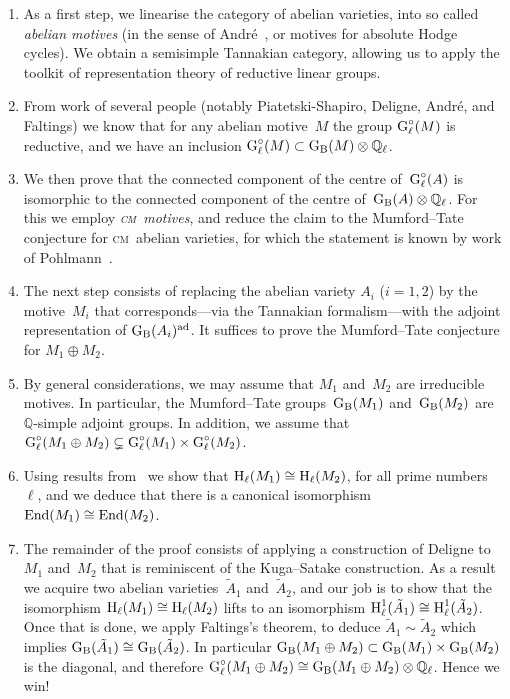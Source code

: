 \documentclass[10pt,twoside,leqno]{article}
\numberwithin{equation}{subsection}
\newcommand{\End}{\textnormal{End}}
\newcommand{\QQ}{\mathbb{Q}}
\newcommand{\QQl}{\QQ_{\ell}}
\newcommand{\ad}{\textnormal{ad}}
\newcommand{\HH}{\textnormal{H}}
\newcommand{\Hl}{\HH_{\ell}}
\newcommand{\GG}{\textnormal{G}}
\newcommand{\GB}{\GG_{\textnormal{B}}}
\newcommand{\Gl}{\GG_{\ell}}
\newcommand{\Glc}{\Gl^{\circ}}
\newcommand{\cm}{\textsc{cm}}
\begin{document}
\begin{enumerate}
 \item As a first step, we linearise the category of abelian varieties,
  into so called \emph{abelian motives} (in the sense of Andr\'e~\cite{An95},
  or motives for absolute Hodge cycles).
  We obtain a semisimple Tannakian category,
  allowing us to apply the toolkit
  of representation theory of reductive linear groups.
 \item From work of several people (notably Piatetski-Shapiro,
  Deligne, Andr\'e, and Faltings) we know that for any abelian motive~$M$
  the group $\Glc(M)$ is reductive,
  and we have an inclusion $\Glc(M) \subset \GB(M) \otimes \QQl$.
 \item We then prove that the connected component of the centre of~$\Glc(A)$ is
  isomorphic to the connected component of the centre of~$\GB(A) \otimes \QQl$.
  For this we employ \emph{\cm~motives},
  and reduce the claim to the Mumford--Tate conjecture for \cm~abelian varieties,
  for which the statement is known by work of Pohlmann~\cite{Pohl68}.
 \item The next step consists of replacing the abelian variety $A_i$ ($i = 1,2$)
  by the motive~$M_i$ that corresponds---via the Tannakian formalism---with
  the adjoint representation of $\GB(A_i)^\ad$.
  It suffices to prove the Mumford--Tate conjecture for $M_1 \oplus M_2$.
 \item By general considerations,
  we may assume that $M_1$ and~$M_2$ are irreducible motives.
  In particular, the Mumford--Tate groups~$\GB(M_1)$ and~$\GB(M_2)$
  are $\QQ$-simple adjoint groups.
  In addition, we assume that
  $\Glc(M_1 \oplus M_2) \subsetneq \Glc(M_1) \times \Glc(M_2)$.
 \item Using results from~\cite{Co17} we show that $\Hl(M_1) \cong \Hl(M_2)$,
  for all prime numbers~$\ell$,
  and we deduce that there is a canonical isomorphism
  $\End(M_1) \cong \End(M_2)$.
 \item The remainder of the proof consists of applying
  a construction of Deligne to~$M_1$ and~$M_2$
  that is reminiscent of the Kuga--Satake construction.
  As a result we acquire two abelian varieties~$\tilde A_1$ and~$\tilde A_2$,
  and our job is to show that the isomorphism $\Hl(M_1) \cong \Hl(M_2)$
  lifts to an isomorphism $\Hl^1(\tilde A_1) \cong \Hl^1(\tilde A_2)$.
  Once that is done,
  we apply Faltings's theorem, to deduce $\tilde A_1 \sim \tilde A_2$
  which implies $\GB(\tilde A_1) \cong \GB(\tilde A_2)$.
  In particular $\GB(M_1 \oplus M_2) \subset \GB(M_1) \times \GB(M_2)$
  is the diagonal,
  and therefore $\Glc(M_1 \oplus M_2) \cong \GB(M_1 \oplus M_2) \otimes \QQl$.
  Hence we win!
\end{enumerate}
\end{document}
